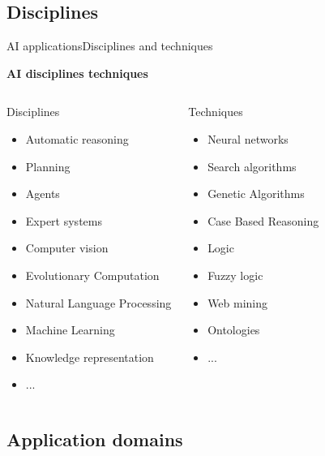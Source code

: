 \documentclass[10pt,compress]{beamer} %
\begin{document}
\subsection{Disciplines}
\begin{frame}{AI applications}{Disciplines and techniques}
	\vspace{-0.4cm}
	\begin{center}
		\textbf{AI disciplines techniques}
	\end{center}
	\begin{columns}
	   		\begin{block}{Disciplines}
			\begin{itemize}
			\item Automatic reasoning
			\item Planning
			\item Agents
			\item Expert systems
			\item Computer vision
			\item Evolutionary Computation
			\item Natural Language Processing
			\item Machine Learning
			\item Knowledge representation
			\item ...
			\end{itemize}
			\end{block}
	   		\begin{block}{Techniques}
			\begin{itemize}
			\item Neural networks
			\item Search algorithms
			\item Genetic Algorithms
			\item Case Based Reasoning
			\item Logic
			\item Fuzzy logic
			\item Web mining
			\item Ontologies
			\item ...
			\end{itemize}
			\end{block}
	\end{columns}
\end{frame}

\subsection{Application domains}
\end{document}
